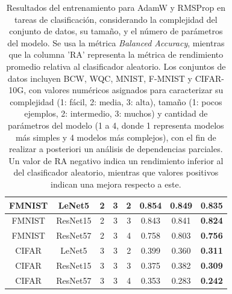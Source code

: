 \begin{table}[]
{\begin{tabular}{|c|c|c|c|c|c|c|c|}
FMNIST                     & LeNet5          & 2                    & 3               & 2                   & 0.854          & 0.849            & \textbf{0.835} \\ \hline
FMNIST                     & ResNet15        & 2                    & 3               & 3                   & 0.843          & 0.841            & \textbf{0.824} \\ \hline
FMNIST                     & ResNet57        & 2                    & 3               & 4                   & 0.758          & 0.803            & \textbf{0.756} \\ \hline
CIFAR                      & LeNet5          & 3                    & 3               & 2                   & 0.399          & 0.360            & \textbf{0.311} \\ \hline
CIFAR                      & ResNet15        & 3                    & 3               & 3                   & 0.375          & 0.382            & \textbf{0.309} \\ \hline
CIFAR                      & ResNet57        & 3                    & 3               & 4                   & 0.353          & 0.283            & \textbf{0.242} \\ \hline
\end{tabular}}
\caption[Resultados del entrenamiento para AdamW y RMSProp en tareas de clasificación, considerando la complejidad del conjunto de datos, su tamaño, y el número de parámetros del modelo]{Resultados del entrenamiento para AdamW y RMSProp en tareas de clasificación, considerando la complejidad del conjunto de datos, su tamaño, y el número de parámetros del modelo. Se usa la métrica \textit{Balanced Accuracy}, mientras que la columna 'RA' representa la métrica de rendimiento promedio relativa al clasificador aleatorio. Los conjuntos de datos incluyen BCW, WQC, MNIST, F-MNIST y CIFAR-10G, con valores numéricos asignados para caracterizar su complejidad (1: fácil, 2: media, 3: alta), tamaño (1: pocos ejemplos, 2: intermedio, 3: muchos) y cantidad de parámetros del modelo (1 a 4, donde 1 representa modelos más simples y 4 modelos más complejos), con el fin de realizar a posteriori un análisis de dependencias parciales. Un valor de RA negativo indica un rendimiento inferior al del clasificador aleatorio, mientras que valores positivos indican una mejora respecto a este.}
\label{tab:esc2}
\end{table}



